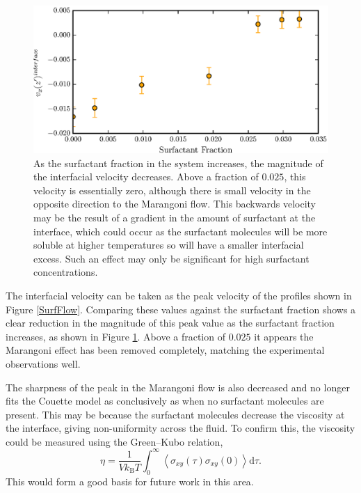 \FloatBarrier
\begin{figure}[h]
\centering
\includegraphics[scale=0.8]{InterVel}
\caption{As the surfactant fraction in the system increases, the magnitude of the interfacial velocity decreases.
Above a fraction of $0.025$, this velocity is essentially zero, although there is small velocity in the opposite direction to the Marangoni flow.
This backwards velocity may be the result of a gradient in the amount of surfactant at the interface, which could occur as the surfactant molecules will be more soluble at higher temperatures so will have a smaller interfacial excess.
Such an effect may only be significant for high surfactant concentrations.
}
\label{InterVel}
\end{figure}
The interfacial velocity can be taken as the peak velocity of the profiles shown in Figure \ref{SurfFlow}.
Comparing these values against the surfactant fraction shows a clear reduction in the magnitude of this peak value as the surfactant fraction increases, as shown in Figure \ref{InterVel}.
Above a fraction of $0.025$ it appears the Marangoni effect has been removed completely, matching the experimental observations well.

\FloatBarrier
The sharpness of the peak in the Marangoni flow is also decreased and no longer fits the Couette model as conclusively as when no surfactant molecules are present.
This may be because the surfactant molecules decrease the viscosity at the interface, giving non-uniformity across the fluid. 
To confirm this, the viscosity could be measured using the Green--Kubo relation,
\begin{equation}
\eta = \frac{1}{V k_{\mathrm{B}} T} \int_{0}^{\infty} \left< \sigma_{xy} \left( \tau \right) \sigma_{xy}(0) \right> \mathrm{d} \tau.
\end{equation}
This would form a good basis for future work in this area.
